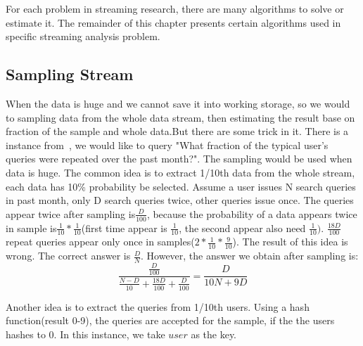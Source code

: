 \begin{quote}
\begin{itemize}
\begin{comment}
    \item \textbf{Wavelet coefficients} are projections of the given signal (set
    of data values) onto an orthogonal set of basis vectors. The coefficients
    have the desirable property that the signal reconstructed from the top few
    wavelet coefficients b est approximates the original signal in terms of the
    L2 norm~\cite{gilbert2002fast}. The choice of basis vectors determines the
    type of wavelets.
\end{comment}

\end{itemize}
\end{quote}

For each problem in streaming research, there are many algorithms to solve or
estimate it. The remainder of this chapter presents certain algorithms used in
specific streaming analysis problem.

\subsection{Sampling Stream}

When the data is huge and we cannot save it into working storage, so we would to
sampling data from the whole data stream, then estimating the result base on
fraction of the sample and whole data.But there are some trick in it. There is a
instance from~\cite{leskovec2014mining}, we would like to query "What fraction
of the typical user's queries were repeated over the past month?". The sampling
would be used when data is huge. The common idea is to extract 1/10th data from
the whole stream, each data has 10\% probability be selected. Assume a user
issues N search queries in past month, only D search queries twice, other
queries issue once. The queries appear twice after sampling is$\frac{D}{100}$,
because the probability of a data appears twice in sample
is$\frac{1}{10}*\frac{1}{10}$(first time appear is $\frac{1}{10}$, the second
appear also need $\frac{1}{10})$. $\frac{18D}{100}$ repeat queries appear only
once in samples($2*\frac{1}{10}*\frac{9}{10}$). The result of this idea is
wrong. The correct answer is $\frac{D}{N}$. However, the answer we obtain after
sampling is:
\begin{equation*}
    \frac{\frac{D}{100}}{\frac{N-D}{10}+\frac{18D}{100}+\frac{D}{100}} = \frac{D}{10N+9D}
\end{equation*}

Another idea is to extract the queries from 1/10th users. Using a hash
function(result 0-9), the queries are accepted for the sample, if the the users
hashes to 0. In this instance, we take $user$ as the key. 

